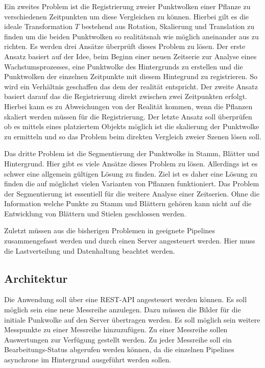 \documentclass[12pt,titlepage, twoside]{article}
\begin{document}
Ein zweites Problem ist die Registrierung zweier Punktwolken einer Pflanze zu verschiedenen Zeitpunkten um diese Vergleichen zu können. 
Hierbei gilt es die ideale Transformation $T$ bestehend aus Rotation, Skalierung und Translation zu finden um die beiden Punktwolken so realitätsnah wie möglich aneinander aus zu richten.
Es werden drei Ansätze überprüft dieses Problem zu lösen. 
Der erste Ansatz basiert auf der Idee, beim Beginn einer neuen Zeitserie zur Analyse eines Wachstumsprozesses, eine Punktwolke des Hintergrunds zu erstellen und die Punktwolken der einzelnen Zeitpunkte mit diesem Hintegrund zu registrieren. So wird ein Verhältnis geschaffen das dem der realität entspricht.
Der zweite Ansatz basiert darauf das die Registrierung direkt zwischen zwei Zeitpunkten erfolgt. Hierbei kann es zu Abweichungen von der Realität kommen, wenn die Pflanzen skaliert werden müssen für die Registrierung.
Der letzte Ansatz soll überprüfen ob es mittels eines platziertem Objekts möglich ist die skalierung der Punktwolke zu ermitteln und so das Problem beim direkten Vergleich zweier Szenen lösen soll.

Das dritte Problem ist die Segmentierung der Punktwolke in Stamm, Blätter und Hintergrund. Hier gibt es viele Ansätze dieses Problem zu lösen. Allerdings ist es schwer eine allgemein gültigen Lösung zu finden. 
Ziel ist es daher eine Lösung zu finden die auf möglichst vielen Varianten von Pflanzen funktioniert. 
Das Problem der Segmentierung ist essentiell für die weitere Analyse einer Zeitserien. Ohne die Information welche Punkte zu Stamm und Blättern gehören kann nicht auf die Entwicklung von Blättern und Stielen geschlossen werden.

Zuletzt müssen aus die bisherigen Problemen in geeignete Pipelines zusammengefasst werden und durch einen Server angesteuert werden. Hier muss die Lastverteilung und Datenhaltung beachtet werden.

\subsection{Architektur}
\label{sec:realisierung:architektur}

Die Anwendung soll über eine REST-API angesteuert werden können. Es soll möglich sein eine neue Messreihe anzulegen. Dazu müssen die Bilder für die initiale Punkwolke auf den Server übertragen werden. 
Es soll möglich sein weitere Messpunkte zu einer Messreihe hinzuzufügen. Zu einer Messreihe sollen Auswertungen zur Verfügung gestellt werden. 
Zu jeder Messreihe soll ein Bearbeitungs-Status abgerufen werden können, da die einzelnen Pipelines asynchrone im Hintergrund ausgeführt werden sollen. 
\end{document}

